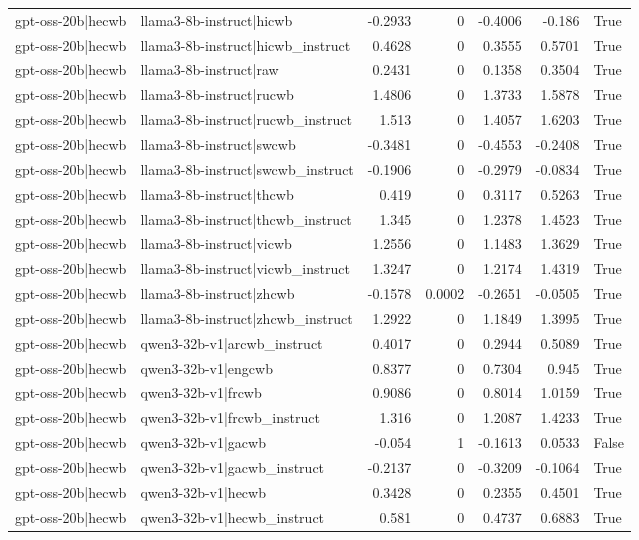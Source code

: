 \begin{table}
\begin{tabular}{l l r r r r l}
gpt-oss-20b|hecwb & llama3-8b-instruct|hicwb & -0.2933 & 0 & -0.4006 & -0.186 & True \\
gpt-oss-20b|hecwb & llama3-8b-instruct|hicwb_instruct & 0.4628 & 0 & 0.3555 & 0.5701 & True \\
gpt-oss-20b|hecwb & llama3-8b-instruct|raw & 0.2431 & 0 & 0.1358 & 0.3504 & True \\
gpt-oss-20b|hecwb & llama3-8b-instruct|rucwb & 1.4806 & 0 & 1.3733 & 1.5878 & True \\
gpt-oss-20b|hecwb & llama3-8b-instruct|rucwb_instruct & 1.513 & 0 & 1.4057 & 1.6203 & True \\
gpt-oss-20b|hecwb & llama3-8b-instruct|swcwb & -0.3481 & 0 & -0.4553 & -0.2408 & True \\
gpt-oss-20b|hecwb & llama3-8b-instruct|swcwb_instruct & -0.1906 & 0 & -0.2979 & -0.0834 & True \\
gpt-oss-20b|hecwb & llama3-8b-instruct|thcwb & 0.419 & 0 & 0.3117 & 0.5263 & True \\
gpt-oss-20b|hecwb & llama3-8b-instruct|thcwb_instruct & 1.345 & 0 & 1.2378 & 1.4523 & True \\
gpt-oss-20b|hecwb & llama3-8b-instruct|vicwb & 1.2556 & 0 & 1.1483 & 1.3629 & True \\
gpt-oss-20b|hecwb & llama3-8b-instruct|vicwb_instruct & 1.3247 & 0 & 1.2174 & 1.4319 & True \\
gpt-oss-20b|hecwb & llama3-8b-instruct|zhcwb & -0.1578 & 0.0002 & -0.2651 & -0.0505 & True \\
gpt-oss-20b|hecwb & llama3-8b-instruct|zhcwb_instruct & 1.2922 & 0 & 1.1849 & 1.3995 & True \\
gpt-oss-20b|hecwb & qwen3-32b-v1|arcwb_instruct & 0.4017 & 0 & 0.2944 & 0.5089 & True \\
gpt-oss-20b|hecwb & qwen3-32b-v1|engcwb & 0.8377 & 0 & 0.7304 & 0.945 & True \\
gpt-oss-20b|hecwb & qwen3-32b-v1|frcwb & 0.9086 & 0 & 0.8014 & 1.0159 & True \\
gpt-oss-20b|hecwb & qwen3-32b-v1|frcwb_instruct & 1.316 & 0 & 1.2087 & 1.4233 & True \\
gpt-oss-20b|hecwb & qwen3-32b-v1|gacwb & -0.054 & 1 & -0.1613 & 0.0533 & False \\
gpt-oss-20b|hecwb & qwen3-32b-v1|gacwb_instruct & -0.2137 & 0 & -0.3209 & -0.1064 & True \\
gpt-oss-20b|hecwb & qwen3-32b-v1|hecwb & 0.3428 & 0 & 0.2355 & 0.4501 & True \\
gpt-oss-20b|hecwb & qwen3-32b-v1|hecwb_instruct & 0.581 & 0 & 0.4737 & 0.6883 & True \\

\end{tabular}
\end{table}
